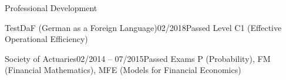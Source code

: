 \documentclass{resume}
\begin{document}
    \begin{cvSection}{Professional Development }

        \begin{cvSubsection}{TestDaF (German as a Foreign Language)}{02/2018}{Passed Level C1 (Effective Operational Efficiency)}{}
        \end{cvSubsection}

        \begin{cvSubsection}{Society of Actuaries}{02/2014 -- 07/2015}{Passed Exams P (Probability), FM (Financial Mathematics), MFE (Models for Financial Economics)}{}
        \end{cvSubsection}

    \end {cvSection}
\end{document}
